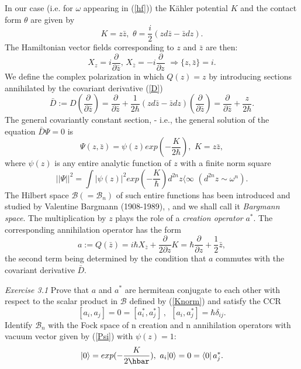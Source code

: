 \documentclass[12pt]{article}
\begin{document}
In our case (i.e. for $\omega$ appearing in (\ref{hf})) the K\"ahler potential $K$ and the contact form $\theta$ are given by
\begin{equation}
\label{Ktheta}
K = z \bar z, \, \, \theta = \frac{i}{2}(zd\bar z - \bar z dz).
\end{equation}
The Hamiltonian vector fields corresponding to $z$ and $\bar{z}$ are then:
\begin{equation}
\label{z/bar}
X_z=i\frac{\partial}{\partial{\bar z}}, \, X_{\bar z}=
-i\frac{\partial}{\partial z} \, \, \Rightarrow \{z,\bar z\} = i.
\end{equation} 
We define the complex polarization in which $Q(z) = z$ by introducing sections annihilated by the covariant derivative (\ref{D})
\begin{equation}
\label{Dbar}
\bar D:= D(\frac{\partial}{\partial{\bar z}}) = 
\frac{\partial}{\partial{\bar z}} + \frac{1}{2\hbar}(zd\bar z - \bar z dz) 
(\frac{\partial}{\partial{\bar z}} ) = \frac{\partial}{\partial{\bar z}}  + 
\frac{z}{2\hbar}. 
\end{equation}
The general covariantly constant section, - i.e., the general solution of
the equation  $\bar D \Psi = 0$ is
\begin{equation}
\label{Psi}
\Psi (z, \bar z) = \psi(z) exp(-\frac{K}{2\hbar}), \, \, K=z\bar z,  
\end{equation}
 where $\psi(z)$ is any entire analytic function of $z$ with a finite 
norm square
\begin{equation}
\label{Knorm}
||\Psi||^2 = \int |\psi(z)|^2 exp(-\frac{K}{\hbar})d^{2n}z \langle  \infty \, \,
(d^{2n}z \sim \omega^n). 
\end{equation}
The Hilbert space ${\mathcal B}(= {\mathcal B}_n)$ of such entire functions 
has been introduced and studied by Valentine Bargmann (1908-1989), \cite{B61}, 
and we shall call it {\it Bargmann space}. The multiplication by $z$ plays 
the role of a {\it creation operator} $a^*$. The corresponding annihilation operator has the form 
\begin{equation}
\label{a}
a:=Q(\bar z)= i\hbar X_{\bar z} + \frac{\partial}{2 \partial z} K = 
\hbar\frac{\partial}{\partial z} + \frac{1}{2}\bar z,
\end{equation}
the second term being determined by the condition that $a$ commutes with the covariant derivative $\bar D$.

{\it Exercise 3.1} Prove that $a$ and $a^*$ are hermitean conjugate to each other with respect to the scalar product in ${\mathcal B}$ defined by (\ref{Knorm}) and satisfy the CCR
\begin{equation}
\label{aa*}
[a_i, a_j] =0 = [a^*_i, a^*_j] \,, \ \ [a_i, a^*_j] = \hbar\delta_{ij}.
\end{equation}
Identify ${\mathcal B}_n$ with the Fock space of n creation and n annihilation 
operators with vacuum vector given by (\ref{Psi}) with $\psi(z) = 1$:
\begin{equation}
\label{vac}
\vac = exp(-\frac{K}{2\hbar}), \, \, a_i\vac = 0 = \langle 0|\, a_j^*.
\end{equation} 
\end{document}
